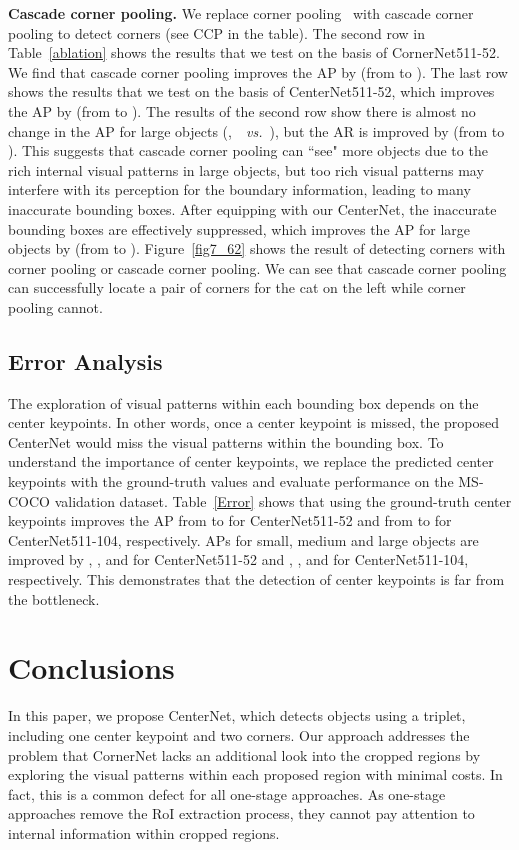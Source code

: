 \documentclass[10pt,twocolumn,letterpaper]{article}
\begin{document}
\vspace{1ex}\noindent\textbf{Cascade corner pooling.} We replace corner pooling~\cite{law2018cornernet} with cascade corner pooling to detect corners (see CCP in the table). The second row in Table~\ref{ablation} shows the results that we test on the basis of CornerNet511-52. We find that cascade corner pooling improves the AP by  (from  to ). The last row shows the results that we test on the basis of CenterNet511-52, which improves the AP by  (from  to ). The results of the second row show there is almost no change in the AP for large objects (\ie,~~\emph{vs.}~), but the AR is improved by  (from  to ). This suggests that cascade corner pooling can ``see" more objects due to the rich internal visual patterns in large objects, but too rich visual patterns may interfere with its perception for the boundary information, leading to many inaccurate bounding boxes. After equipping with our CenterNet, the inaccurate bounding boxes are effectively suppressed, which improves the AP for large objects by  (from  to ). Figure~\ref{fig7_62} shows the result of detecting corners with corner pooling or cascade corner pooling. We can see that cascade corner pooling can successfully locate a pair of corners for the cat on the left while corner pooling cannot.

\subsection{Error Analysis} The exploration of visual patterns within each bounding box depends on the center keypoints. In other words, once a center keypoint is missed, the proposed CenterNet would miss the visual patterns within the bounding box. To understand the importance of center keypoints, we replace the predicted center keypoints with the ground-truth values and evaluate performance on the MS-COCO validation dataset. Table~\ref{Error} shows that using the ground-truth center keypoints improves the AP from  to  for CenterNet511-52 and from  to  for CenterNet511-104, respectively. APs for small, medium and large objects are improved by , , and  for CenterNet511-52 and , , and  for CenterNet511-104, respectively. This demonstrates that the detection of center keypoints is far from the bottleneck.

\section{Conclusions}
\label{Conclusions}
In this paper, we propose CenterNet, which detects objects using a triplet, including one center keypoint and two corners. Our approach addresses the problem that CornerNet lacks an additional look into the cropped regions by exploring the visual patterns within each proposed region with minimal costs. In fact, this is a common defect for all one-stage approaches. As one-stage approaches remove the RoI extraction process, they cannot pay attention to internal information within cropped regions. 
\end{document}
